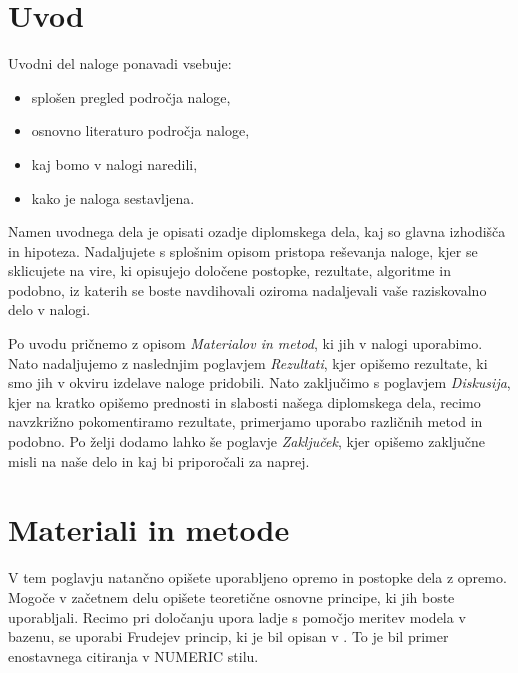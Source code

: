 \documentclass[pomnav,SMER=splošna]{fppthesis}
\begin{document}
	
	
\section{Uvod}
\label{sec:Uvod}

Uvodni del naloge ponavadi vsebuje:

\begin{itemize}[nosep]
	\item splošen pregled področja naloge,
	\item osnovno literaturo področja naloge,
	\item kaj bomo v nalogi naredili,
	\item kako je naloga sestavljena.
\end{itemize}

Namen uvodnega dela je opisati ozadje diplomskega dela, kaj so glavna izhodišča in hipoteza. Nadaljujete s splošnim opisom pristopa reševanja naloge, kjer se sklicujete na vire, ki opisujejo določene postopke, rezultate, algoritme in podobno, iz katerih se boste navdihovali oziroma nadaljevali vaše raziskovalno delo v nalogi.

Po uvodu pričnemo z opisom \textit{Materialov in metod}, ki jih v nalogi uporabimo. Nato nadaljujemo z naslednjim poglavjem \textit{Rezultati}, kjer opišemo rezultate, ki smo jih v okviru izdelave naloge pridobili. Nato zaključimo s poglavjem \textit{Diskusija}, kjer na kratko opišemo prednosti in slabosti našega diplomskega dela, recimo navzkrižno pokomentiramo rezultate, primerjamo uporabo različnih metod in podobno. Po želji dodamo lahko še poglavje \textit{Zaključek}, kjer opišemo zaključne misli na naše delo in kaj bi priporočali za naprej.


\newpage
\section{Materiali in metode}
\label{sec:Materiali}

V tem poglavju natančno opišete uporabljeno opremo in postopke dela z opremo. Mogoče v začetnem delu opišete teoretične osnovne principe, ki jih boste uporabljali. Recimo pri določanju upora ladje s pomočjo meritev modela v bazenu, se uporabi Frudejev princip, ki je bil opisan v \cite{froude1888resistance}. To je bil primer enostavnega citiranja v NUMERIC stilu.
\end{document}
